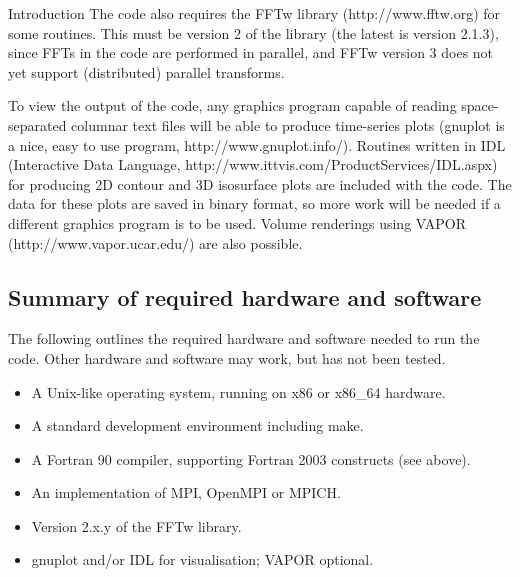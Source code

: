 \begin{chapter}{\label{cha:introduction}Introduction}
  The code also requires the FFTw library (http://www.fftw.org) for some
  routines.  This must be version 2 of the library (the latest is version
  2.1.3), since FFTs in the code are performed in parallel, and FFTw version 3
  does not yet support (distributed) parallel transforms.

  To view the output of the code, any graphics program capable of reading
  space-separated columnar text files will be able to produce time-series plots
  (gnuplot is a nice, easy to use program, http://www.gnuplot.info/).  Routines
  written in IDL (Interactive Data Language,
  http://www.ittvis.com/ProductServices/IDL.aspx) for producing 2D contour and
  3D isosurface plots are included with the code.  The data for these plots are
  saved in binary format, so more work will be needed if a different graphics
  program is to be used.  Volume renderings using VAPOR
  (http://www.vapor.ucar.edu/) are also possible.

  \subsection{Summary of required hardware and software}
  The following outlines the required hardware and software needed to run the
  code.  Other hardware and software may work, but has not been tested.
  \begin{itemize}
    \item A Unix-like operating system, running on x86 or x86\_64 hardware.
    \item A standard development environment including make.
    \item A Fortran 90 compiler, supporting Fortran 2003 constructs (see
      above).
    \item An implementation of MPI, \eg OpenMPI or MPICH.
    \item Version 2.x.y of the FFTw library.
    \item gnuplot and/or IDL for visualisation; VAPOR optional.
  \end{itemize}


\end{chapter}
